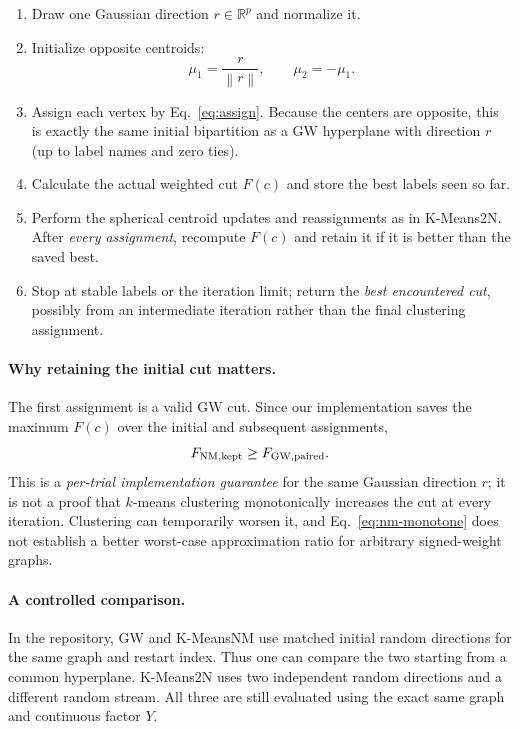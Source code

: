 \documentclass[10pt,letterpaper]{article}
\newcommand{\R}{\mathbb{R}}
\newcommand{\norm}[1]{\left\lVert#1\right\rVert}
\begin{document}
\begin{enumerate}
\item Draw one Gaussian direction $r\in\R^p$ and normalize it.
\item Initialize opposite centroids:
\begin{equation}\label{eq:antipodal}
 \mu_1=\frac{r}{\norm{r}},\qquad
 \mu_2=-\mu_1.
\end{equation}
\item Assign each vertex by Eq.~\eqref{eq:assign}. Because the centers are opposite, this is exactly the same initial bipartition as a GW hyperplane with direction $r$ (up to label names and zero ties).
\item Calculate the actual weighted cut $F(c)$ and store the best labels seen so far.
\item Perform the spherical centroid updates and reassignments as in K-Means2N. After \emph{every assignment}, recompute $F(c)$ and retain it if it is better than the saved best.
\item Stop at stable labels or the iteration limit; return the \emph{best encountered cut}, possibly from an intermediate iteration rather than the final clustering assignment.
\end{enumerate}

\paragraph{Why retaining the initial cut matters.} The first assignment is a valid GW cut. Since our implementation saves the maximum $F(c)$ over the initial and subsequent assignments,
\begin{equation}\label{eq:nm-monotone}
 F_{\rm NM,kept}\ge F_{\rm GW,paired}.
\end{equation}
This is a \emph{per-trial implementation guarantee} for the same Gaussian direction $r$; it is not a proof that $k$-means clustering monotonically increases the cut at every iteration. Clustering can temporarily worsen it, and Eq.~\eqref{eq:nm-monotone} does not establish a better worst-case approximation ratio for arbitrary signed-weight graphs.

\paragraph{A controlled comparison.} In the repository, GW and K-MeansNM use matched initial random directions for the same graph and restart index. Thus one can compare the two starting from a common hyperplane. K-Means2N uses two independent random directions and a different random stream. All three are still evaluated using the exact same graph and continuous factor $Y$.
\end{document}
